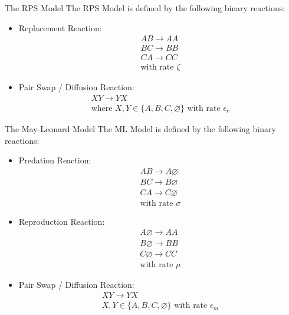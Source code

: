 \documentclass{beamer}
\begin{document}
\begin{frame}{}
\begin{textblock}{0.32}
\begin{block}{The RPS Model}
        The RPS Model is defined by the following binary reactions:
        \begin{itemize}
            \item Replacement Reaction:
            \begin{gather*}
                AB \rightarrow AA\\
                BC \rightarrow BB\\
                CA \rightarrow CC\\            
                \text{with rate } \zeta
            \end{gather*}
            \item Pair Swap / Diffusion Reaction:
            \begin{gather*}
                XY \rightarrow YX \\
                \text{where }X, Y \in \{A, B, C, \varnothing\} \text{ with rate } \epsilon_r
            \end{gather*}
        \end{itemize}
    \end{block}
    \hfill
    \begin{block}{The May-Leonard Model}
        The ML Model is defined by the following binary reactions:
        \begin{itemize}
            \item Predation Reaction:
            \begin{gather*}
                AB \rightarrow A \varnothing \\
                BC \rightarrow B \varnothing \\
                CA \rightarrow C \varnothing \\            
                \text{with rate } \sigma
            \end{gather*}
            \item Reproduction Reaction:
            \begin{gather*}
                A \varnothing \rightarrow AA\\
                B \varnothing \rightarrow BB\\
                C \varnothing \rightarrow CC\\            
                \text{with rate } \mu
            \end{gather*}
            \item Pair Swap / Diffusion Reaction:
            \begin{gather*}
                XY \rightarrow YX \\
                X, Y \in \{A, B, C, \varnothing\} \text{ with rate } \epsilon_m
            \end{gather*}
        \end{itemize}


\end{block}
\end{textblock}
\end{frame}
\end{document}
